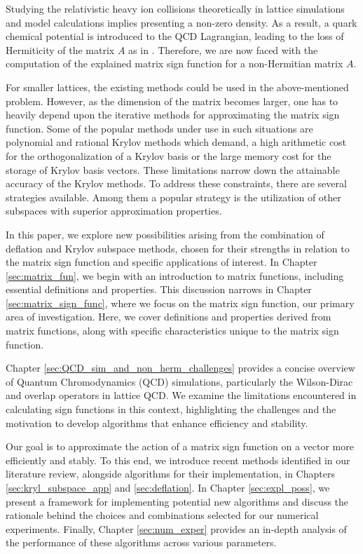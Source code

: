 Studying the relativistic heavy ion collisions theoretically in lattice simulations and model calculations implies presenting a non-zero density. As a result, a quark chemical potential is introduced to the QCD Lagrangian, leading to the loss of Hermiticity of the matrix $A$ as in \cite{16}. Therefore, we are now faced with the computation of the explained matrix sign function for a non-Hermitian matrix $A$.

For smaller lattices, the existing methods could be used in the above-mentioned problem. However, as the dimension of the matrix becomes larger, one has to heavily depend upon the iterative methods for approximating the matrix sign function. Some of the popular methods under use in such situations are polynomial \cite{17,18} and rational \cite{19,20,21} Krylov methods which demand, a high arithmetic cost for the orthogonalization of a Krylov basis or the large memory cost for the storage of Krylov basis vectors. These limitations narrow down the attainable accuracy of the Krylov methods. To address these constraints, there are several strategies available. Among them a popular strategy is the utilization of other subspaces with superior approximation properties.

In this paper, we explore new possibilities arising from the combination of deflation and Krylov subspace methods, chosen for their strengths in relation to the matrix sign function and specific applications of interest. In Chapter \ref{sec:matrix_fun}, we begin with an introduction to matrix functions, including essential definitions and properties. This discussion narrows in Chapter \ref{sec:matrix_sign_func}, where we focus on the matrix sign function, our primary area of investigation. Here, we cover definitions and properties derived from matrix functions, along with specific characteristics unique to the matrix sign function.

Chapter \ref{sec:QCD_sim_and_non_herm_challenges} provides a concise overview of Quantum Chromodynamics (QCD) simulations, particularly the Wilson-Dirac and overlap operators in lattice QCD. We examine the limitations encountered in calculating sign functions in this context, highlighting the challenges and the motivation to develop algorithms that enhance efficiency and stability.

Our goal is to approximate the action of a matrix sign function on a vector more efficiently and stably. To this end, we introduce recent methods identified in our literature review, alongside algorithms for their implementation, in Chapters \ref{sec:kryl_subspace_app} and \ref{sec:deflation}. In Chapter \ref{sec:expl_poss}, we present a framework for implementing potential new algorithms and discuss the rationale behind the choices and combinations selected for our numerical experiments. Finally, Chapter \ref{sec:num_exper} provides an in-depth analysis of the performance of these algorithms across various parameters.